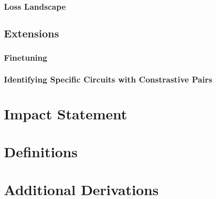 \documentclass{article}
\theoremstyle{plain}
\theoremstyle{definition}
\theoremstyle{remark}
\begin{document}
\subsubsection{Loss Landscape}
\subsection{Extensions}

\subsubsection{Finetuning}

\subsubsection{Identifying Specific Circuits with Constrastive Pairs}


 
\clearpage

\section*{Impact Statement}



\clearpage




\newpage
\appendix
\renewcommand{\thefigure}{S\arabic{figure}}  %
\renewcommand{\theHfigure}{S\arabic{figure}} %
\setcounter{figure}{0}  %
\onecolumn


\section{Definitions}

\section{Additional Derivations}
\end{document}
